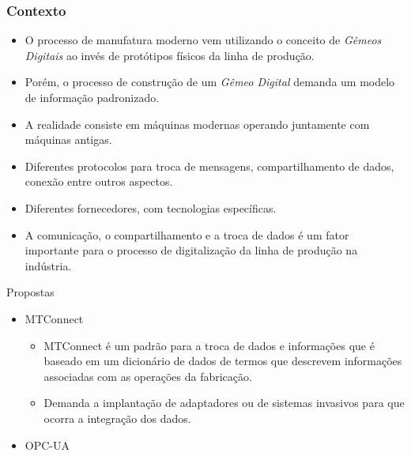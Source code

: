 \documentclass[aspectratio=169]{beamer}
\begin{document}
{\begin{frame}
\end{frame}


\begin{frame}
  \frametitle{Contexto}
  \begin{itemize}
    \item O processo de manufatura moderno vem utilizando o conceito de 
          \emph{Gêmeos Digitais} ao invés de protótipos físicos 
          da linha de produção.
    \item Porém, o processo de construção de um \emph{Gêmeo Digital} 
          demanda um modelo de informação padronizado.
    \item A realidade consiste em máquinas modernas operando juntamente
          com máquinas antigas.
    \item Diferentes protocolos para troca de mensagens, compartilhamento 
          de dados, conexão entre outros aspectos.
    \item Diferentes fornecedores, com tecnologias específicas.
    \item A comunicação, o compartilhamento e a troca de dados é um fator 
          importante para o processo de digitalização da linha de produção 
          na indústria.
  \end{itemize}  

\end{frame}


\begin{frame}{Propostas}

  \begin{itemize}
    \item MTConnect {
    
      \begin{itemize}
        \item {
          MTConnect \'e um padr\~ao para a troca de dados e informações 
          que é baseado em um dicionário de dados de termos que descrevem 
          informações associadas com as operações da fabrica\c c\~ao.
        }
  
        \item {
          Demanda a implanta\c c\~ao de adaptadores ou de sistemas 
          invasivos para que ocorra a integra\c c\~ao dos dados.      
        }  
      \end{itemize}
    }

    \vspace{3mm}
      
    \item OPC-UA {
      \begin{itemize}


\end{itemize}}
\end{itemize}
\end{frame}}
\end{document}

